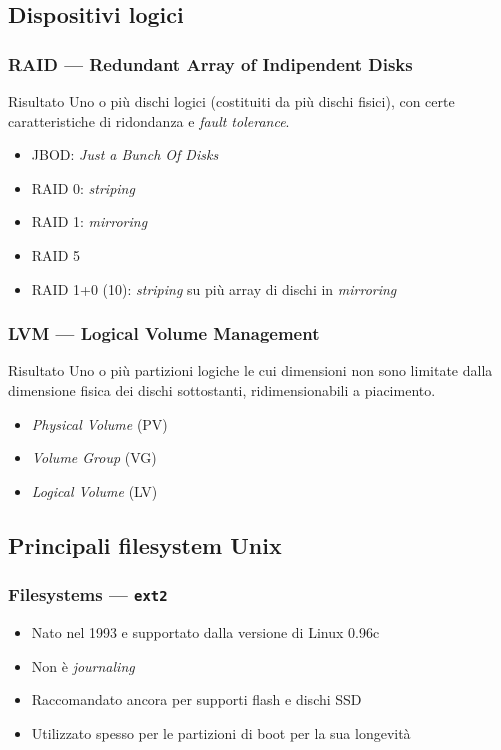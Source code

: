 \documentclass{beamer}
\begin{document}
\subsection{Dispositivi logici}

\begin{frame}[t]
  \frametitle{RAID --- Redundant Array of Indipendent Disks}

  \begin{block}{Risultato}
    Uno o più dischi logici (costituiti da più dischi fisici), con certe
    caratteristiche di ridondanza e \textit{fault tolerance}.
  \end{block}

    \begin{itemize}[<+->]
      \item JBOD: \textit{Just a Bunch Of Disks}
      \item RAID 0: \textit{striping}
      \item RAID 1: \textit{mirroring}
      \item RAID 5
      \item RAID 1+0 (10): \textit{striping} su più array di dischi in
	\textit{mirroring}
    \end{itemize}

\end{frame}

\begin{frame}[t]
  \frametitle{LVM --- Logical Volume Management}

  \begin{block}{Risultato}
    Uno o più partizioni logiche le cui dimensioni non sono limitate dalla
    dimensione fisica dei dischi sottostanti, ridimensionabili a piacimento.
  \end{block}

    \begin{itemize}[<+->]
      \item \textit{Physical Volume} (PV)
      \item \textit{Volume Group} (VG)
      \item \textit{Logical Volume} (LV)
    \end{itemize}
\end{frame}

\subsection{Principali filesystem Unix}

\begin{frame}
  \frametitle{Filesystems --- \texttt{ext2}}

  \begin{itemize}[<+->]
    \item Nato nel 1993 e supportato dalla versione di Linux 0.96c
    \item Non è \textit{journaling}
    \item Raccomandato ancora per supporti flash e dischi SSD
    \item Utilizzato spesso per le partizioni di boot per la sua longevità
  \end{itemize}

\end{frame}
\end{document}
